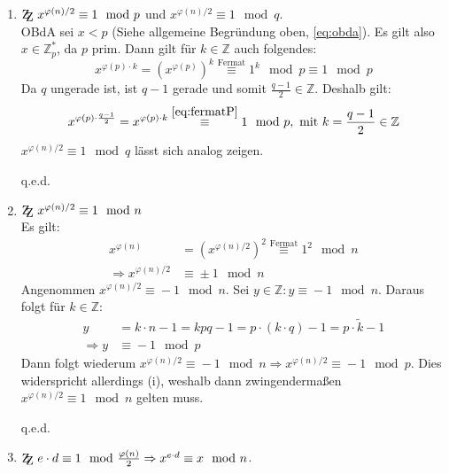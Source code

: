 \documentclass[DIN, pagenumber=false, fontsize=11pt, parskip=half]{scrartcl}
\newcommand{\Z}[0]{\mathbb{Z}}
\newcommand{\ZZ}{\mathrm{Z\kern-.3em\raise-0.5ex\hbox{Z}}}
\newcommand{\congTo}[3][]{\stackrel{#1}{\equiv} #2\mod #3}
\newcommand{\Qed}{\begin{flushright}
    q.e.d.
\end{flushright}}
\begin{document}
    \begin{enumerate}[label=(\roman*)]
        \item $\ZZ \ x^{\varphi(n)/2} \congTo{1}{p}$ und $x^{\varphi(n)/2} \congTo{1}{q}$. \\
              OBdA sei $x < p$ (Siehe allgemeine Begründung oben, \cref{eq:obda}). Es gilt also $x \in \Z_p^*$, da $p$ prim. Dann gilt für $k \in \Z$
              auch folgendes:
              \begin{equation}
                  x^{\varphi(p) \cdot k} = \left(x^{\varphi(p)}\right)^k \congTo[\text{Fermat}]{1^k}{p} \congTo{1}{p}
                  \label{eq:fermatP}
              \end{equation}
              Da $q$ ungerade ist, ist $q - 1$ gerade und somit $\frac{q - 1}{2} \in \Z$. Deshalb gilt:
              \begin{equation}
                  x^{\varphi(p) \cdot \frac{q - 1}{2}} = x^{\varphi(p) \cdot k} \congTo[\ref{eq:fermatP}]{1}{p}, \ \text{mit} \ k = \frac{q - 1}{2} \in \Z
              \end{equation}
              $x^{\varphi(n)/2} \congTo{1}{q}$ lässt sich analog zeigen. \Qed
        \item $\ZZ \ x^{\varphi(n)/2} \congTo{1}{n}$ \\
              Es gilt:
              \begin{align}
                  x^{\varphi(n)} &= \left(x^{\varphi(n)/2}\right)^2 \congTo[\text{Fermat}]{1^2}{n} \\
                  \Rightarrow x^{\varphi(n)/2} &\congTo{\pm 1}{n}
              \end{align}
              Angenommen $x^{\varphi(n)/2} \congTo{-1}{n}$. Sei $y \in \Z : y \congTo{-1}{n}$. Daraus folgt für $k \in \Z$:
              \begin{align}
                  y &= k \cdot n - 1 = k p q - 1 = p \cdot (k \cdot q) - 1 = p \cdot \tilde{k} -1 \\
                  \Rightarrow y &\congTo{-1}{p} \label{eq:mOneInP}
              \end{align}
              Dann folgt wiederum $x^{\varphi(n)/2} \congTo{- 1}{n} \Rightarrow x^{\varphi(n)/2} \congTo{- 1}{p}$. Dies widerspricht allerdings (i), 
              weshalb dann zwingendermaßen $x^{\varphi(n)/2} \congTo{1}{n}$ gelten muss. \Qed
        \item $\ZZ \ e \cdot d \congTo{1}{\frac{\varphi(n)}{2}} \Rightarrow x^{e \cdot d} \congTo{x}{n}$. \\

\end{enumerate}
\end{document}
